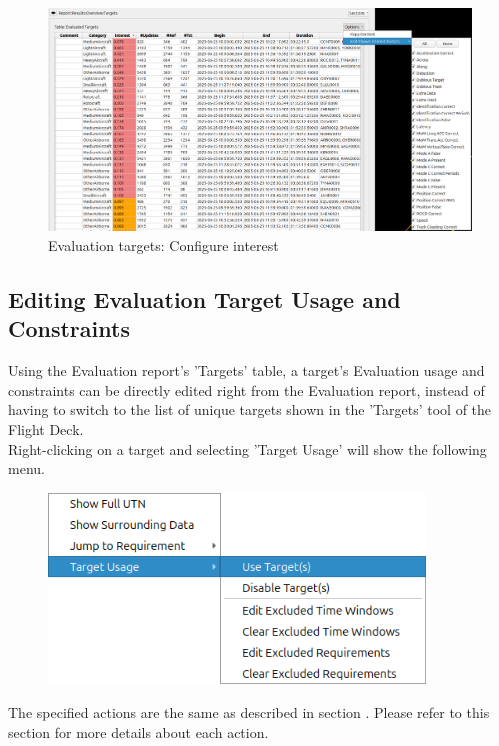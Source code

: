 \begin{figure}[H]
  \hspace*{-2.5cm}
    \includegraphics[width=19cm,frame]{figures/eval_targets_config_interest.png}
  \caption{Evaluation targets: Configure interest}
\end{figure}

\subsection{Editing Evaluation Target Usage and Constraints}
\label{sec:eval_targets_of_interest_usage}

Using the Evaluation report's 'Targets' table, a target's Evaluation usage and constraints 
can be directly edited right from the Evaluation report, instead of having to switch to the 
list of unique targets shown in the 'Targets' tool of the Flight Deck. \\

Right-clicking on a target and selecting 'Target Usage' will show the following menu.

\begin{figure}[H]
  \hspace*{-2cm}
  \center
    \includegraphics[width=10cm,frame]{figures/eval_target_usage.png}
\end{figure}

The specified actions are the same as described in section .
Please refer to this section for more details about each action. \\

